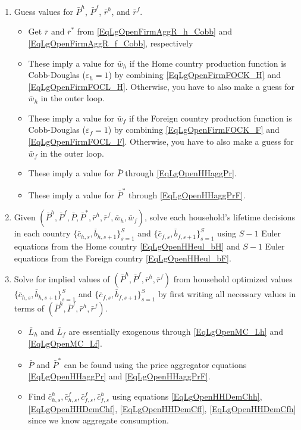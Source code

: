 \documentclass[letterpaper,12pt]{article}
\theoremstyle{definition}
\newcommand\ve{\varepsilon}
\begin{document}
    \begin{enumerate}
      \item Guess values for $\bar{P}^h$, $\bar{P}^f$, $\bar{r}^h$, and $\bar{r}^f$.
      \begin{itemize}
        \item Get $\bar{r}$ and $\bar{r}^*$ from \eqref{EqLgOpenFirmAggR_h_Cobb} and \eqref{EqLgOpenFirmAggR_f_Cobb}, respectively
        \item These imply a value for $\bar{w}_h$ if the Home country production function is Cobb-Douglas ($\ve_h=1$) by combining \eqref{EqLgOpenFirmFOCK_H} and \eqref{EqLgOpenFirmFOCL_H}. Otherwise, you have to also make a guess for $\bar{w}_h$ in the outer loop.
        \item These imply a value for $\bar{w}_f$ if the Foreign country production function is Cobb-Douglas ($\ve_f=1$) by combining \eqref{EqLgOpenFirmFOCK_F} and \eqref{EqLgOpenFirmFOCL_F}. Otherwise, you have to also make a guess for $\bar{w}_f$ in the outer loop.
        \item These imply a value for $\bar{P}$ through \eqref{EqLgOpenHHaggPr}.
        \item These imply a value for $\bar{P}^*$ through \eqref{EqLgOpenHHaggPrF}.
      \end{itemize}
      \item Given $\left(\bar{P}^h, \bar{P}^f, \bar{P}, \bar{P}^*, \bar{r}^h, \bar{r}^f, \bar{w}_h, \bar{w}_f\right)$, solve each household's lifetime decisions in each country $\{\bar{c}_{h,s},\bar{b}_{h,s+1}\}_{s=1}^S$ and $\{\bar{c}_{f,s},\bar{b}_{f,s+1}\}_{s=1}^S$ using $S-1$ Euler equations from the Home country \eqref{EqLgOpenHHeul_bH} and $S-1$ Euler equations from the Foreign country \eqref{EqLgOpenHHeul_bF}.
      \item Solve for implied values of $\left(\bar{P}^h, \bar{P}^f, \bar{r}^h, \bar{r}^f\right)$ from household optimized values $\{\bar{c}_{h,s},\bar{b}_{h,s+1}\}_{s=1}^S$ and $\{\bar{c}_{f,s},\bar{b}_{f,s+1}\}_{s=1}^S$ by first writing all necessary values in terms of $\left(\bar{P}^h, \bar{P}^f, \bar{r}^h, \bar{r}^f\right)$.
      \begin{itemize}
        \item $\bar{L}_h$ and $\bar{L}_f$ are essentially exogenous through \eqref{EqLgOpenMC_Lh} and \eqref{EqLgOpenMC_Lf}.
        \item $\bar{P}$ and $\bar{P}^*$ can be found using the price aggregator equations \eqref{EqLgOpenHHaggPr} and \eqref{EqLgOpenHHaggPrF}.
        \item Find $\bar{c}_{h,s}^h, \bar{c}_{h,s}^f, \bar{c}_{f,s}^f, \bar{c}_{f,s}^h$ using equations \eqref{EqLgOpenHHDemChh}, \eqref{EqLgOpenHHDemChf}, \eqref{EqLgOpenHHDemCff}, \eqref{EqLgOpenHHDemCfh} since we know aggregate consumption.

\end{itemize}
\end{enumerate}
\end{document}
